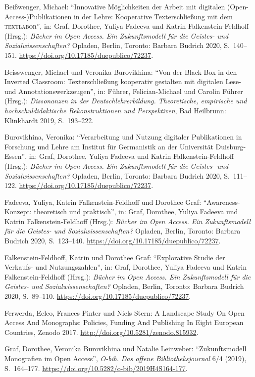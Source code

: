 \documentclass[a4paper,
fontsize=11pt,
oneside,
numbers=noperiodatend,
parskip=half-,
bibliography=totoc,
final
]{scrartcl}
\begin{document}
Beißwenger, Michael: ``Innovative Möglichkeiten der Arbeit mit digitalen
(Open-Access-)Publi\-kationen in der Lehre: Kooperative Texterschließung
mit dem \textsc{textlabor}'', in: Graf, Dorothee, Yuliya Fadeeva und
Katrin Falkenstein-Feldhoff (Hrsg.): \emph{Bücher im Open Access. Ein
Zukunftsmodell für die Geistes- und Sozialwissenschaften?} Opladen,
Berlin, Toronto: Barbara Budrich 2020, S.~140--151.
\url{https://doi.org/10.17185/duepublico/72237}.

Beisswenger, Michael und Veronika Burovikhina: ``Von der Black Box in
den Inverted Classroom: Texterschließung kooperativ gestalten mit
digitalen Lese- und Annotationswerkzeugen'', in: Führer,
Felician-Michael und Carolin Führer (Hrsg.): \emph{Dissonanzen in der
Deutschlehrerbildung. Theoretische, empirische und hochschuldidaktische
Rekonstruktionen und Perspektiven}, Bad Heilbrunn: Klinkhardt 2019,
S.~193--222.

Burovikhina, Veronika: ``Verarbeitung und Nutzung digitaler
Publikationen in Forschung und Lehre am Institut für Germanistik an der
Universität Duisburg-Essen'', in: Graf, Dorothee, Yuliya Fadeeva und
Katrin Falkenstein-Feldhoff (Hrsg.): \emph{Bücher im Open Access. Ein
Zukunftsmodell für die Geistes- und Sozialwissenschaften?} Opladen,
Berlin, Toronto: Barbara Budrich 2020, S.~111--122.
\url{https://doi.org/10.17185/duepublico/72237}.

Fadeeva, Yuliya, Katrin Falkenstein-Feldhoff und Dorothee Graf:
``Awareness-Konzept: theoretisch und praktisch'', in: Graf, Dorothee,
Yuliya Fadeeva und Katrin Falkenstein-Feldhoff (Hrsg.): \emph{Bücher im
Open Access. Ein Zukunftsmodell für die Geistes- und
Sozialwissenschaften?} Opladen, Berlin, Toronto: Barbara Budrich 2020,
S.~123--140. \url{https://doi.org/10.17185/duepublico/72237}.

Falkenstein-Feldhoff, Katrin und Dorothee Graf: ``Explorative Studie der
Verkaufs- und Nutzungszahlen'', in: Graf, Dorothee, Yuliya Fadeeva und
Katrin Falkenstein-Feldhoff (Hrsg.): \emph{Bücher im Open Access. Ein
Zukunftsmodell für die Geistes- und Sozialwissenschaften?} Opladen,
Berlin, Toronto: Barbara Budrich 2020, S.~89--110.
\url{https://doi.org/10.17185/duepublico/72237}.

Ferwerda, Eelco, Frances Pinter und Niels Stern: A Landscape Study On
Open Access And Monographs: Policies, Funding And Publishing In Eight
European Countries, Zenodo 2017.
\url{http://doi.org/10.5281/zenodo.815932}.

Graf, Dorothee, Veronika Burovikhina und Natalie Leinweber:
``Zukunftsmodell Monografien im Open Access'', \emph{O-bib. Das offene
Bibliotheksjournal} 6/4 (2019), S.~164--177.
\url{https://doi.org/10.5282/o-bib/2019H4S164-177}.
\end{document}

